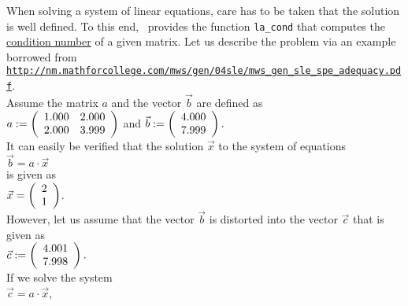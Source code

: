\noindent
When solving a system of linear equations, care has to be taken that the solution is well defined.
To this end, \setlx\ provides the function \texttt{la\_cond} that computes the 
\href{http://en.wikipedia.org/wiki/Condition_number}{condition number} of a given matrix.
Let us describe the problem via an example borrowed from
\\[0.2cm]
\hspace*{1.3cm}
\href{http://nm.mathforcollege.com/mws/gen/04sle/mws_gen_sle_spe_adequacy.pdf}{\texttt{http://nm.mathforcollege.com/mws/gen/04sle/mws\_gen\_sle\_spe\_adequacy.pdf}}.
\\[0.2cm]
Assume the matrix $a$ and the vector $\vec{b}$ are defined as
\\[0.2cm]
\hspace*{1.3cm}
$a := \left(
  \begin{array}[c]{ll}
    1.000 &  2.000 \\
    2.000 &  3.999
  \end{array}
  \right)
$  \quad and \quad
$\vec{b} := \left(
  \begin{array}[c]{l}
    4.000 \\ 7.999
  \end{array}
  \right).
$
\\[0.2cm]
It can easily be verified that the solution $\vec{x}$ to the system of equations 
\\[0.2cm]
\hspace*{1.3cm}
$\vec{b} = a \cdot \vec{x}$
\\[0.2cm]
is given as
\\[0.2cm]
\hspace*{1.3cm}
$\vec{x}  = 
 \left(
   \begin{array}[c]{l}
     2 \\ 1
   \end{array}
  \right)
$.
\\[0.2cm]
However, let us assume that the vector $\vec{b}$ is distorted into the vector $\vec{c}$ that is
given as
\\[0.2cm]
\hspace*{1.3cm}
$\vec{c} := \left(
  \begin{array}[c]{l}
    4.001 \\ 7.998
  \end{array}
  \right).
$
\\[0.2cm]
If we solve the system
\\[0.2cm]
\hspace*{1.3cm}
$\vec{c} = a \cdot \vec{x}$,
\\[0.2cm]
